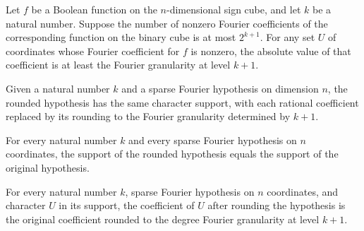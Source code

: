 \begin{theorem}
\label{FABL.degreeFourierGranularity_le_abs_fourierCoeff_of_exactSparseSpectrum}
\leanok
{}
Let $f$ be a Boolean function on the $n$-dimensional sign cube, and let $k$ be a natural
number. Suppose the number of nonzero Fourier coefficients of the corresponding function
on the binary cube is at most $2^{k+1}$. For any set $U$ of coordinates whose Fourier
coefficient for $f$ is nonzero, the absolute value of that coefficient is at least the
Fourier granularity at level $k+1$.
\end{theorem}

\begin{definition}
\label{FABL.roundSparseSpectrumHypothesis}
\leanok
{}
Given a natural number $k$ and a sparse Fourier hypothesis on dimension $n$, the rounded
hypothesis has the same character support, with each rational coefficient replaced by
its rounding to the Fourier granularity determined by $k+1$.
\end{definition}

\begin{theorem}
\label{FABL.roundSparseSpectrumHypothesis_support}
\leanok
{}
For every natural number $k$ and every sparse Fourier hypothesis on $n$ coordinates, the
support of the rounded hypothesis equals the support of the original hypothesis.
\end{theorem}

\begin{theorem}
\label{FABL.roundSparseSpectrumHypothesis_coefficient}
\leanok
{}
For every natural number $k$, sparse Fourier hypothesis on $n$ coordinates, and
character $U$ in its support, the coefficient of $U$ after rounding the hypothesis is
the original coefficient rounded to the degree Fourier granularity at level $k+1$.
\end{theorem}

